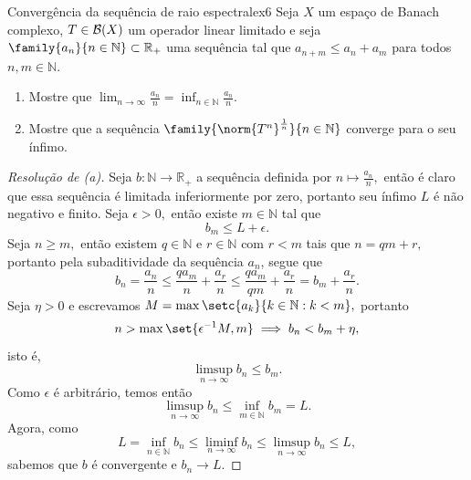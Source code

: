 \begin{exercício}{Convergência da sequência de raio espectral}{ex6}
Seja \(X\) um espaço de Banach complexo, \(T \in \mathcal{B}(X)\) um operador linear limitado e seja \(\family{a_n}{n\in \mathbb{N}} \subset \mathbb{R}_+\) uma sequência tal que \(a_{n+m} \leq a_n + a_m\) para todos \(n,m \in \mathbb{N}.\)
\begin{enumerate}[label=(\alph*)]
  \item Mostre que \(\lim_{n \to \infty}{\frac{a_n}{n}}= \inf_{n\in \mathbb{N}}{\frac{a_n}{n}}.\)
  \item Mostre que a sequência \(\family{\norm{T^n}^{\frac1n}}{n\in\mathbb{N}}\) converge para o seu ínfimo.
\end{enumerate}
\end{exercício}
\begin{proof}[Resolução de (a)]
  Seja \(b : \mathbb{N} \to \mathbb{R}_+\) a sequência definida por \(n \mapsto \frac{a_n}{n},\) então é claro que essa sequência é limitada inferiormente por zero, portanto seu ínfimo \(L\) é não negativo e finito. Seja \(\epsilon > 0,\) então existe \(m \in \mathbb{N}\) tal que
  \begin{equation*}
      b_m \leq L + \epsilon.
  \end{equation*}
  Seja \(n \geq m,\) então existem \(q \in \mathbb{N}\) e \(r \in \mathbb{N}\) com \(r < m\) tais que \(n = qm + r,\) portanto pela subaditividade da sequência \(a_n\), segue que
  \begin{equation*}
    b_n = \frac{a_n}{n} \leq \frac{q a_m}{n} + \frac{a_r}{n} \leq \frac{q a_m}{qm} + \frac{a_r}{n} = b_m + \frac{a_r}{n}.
  \end{equation*}
  Seja \(\eta > 0\) e escrevamos \(M = \max\setc{a_k}{k \in \mathbb{N} : k < m},\) portanto
  \begin{equation*}
    n > \max\set{\epsilon^{-1} M, m} \implies b_n < b_m + \eta,
  \end{equation*}
  isto é,
  \begin{equation*}
    \limsup_{n\to\infty}{b_n} \leq b_m.
  \end{equation*}
  Como \(\epsilon\) é arbitrário, temos então
  \begin{equation*}
    \limsup_{n\to\infty}{b_n} \leq \inf_{m \in \mathbb{N}}{b_m} = L.
  \end{equation*}
  Agora, como
  \begin{equation*}
    L = \inf_{n \in \mathbb{N}}{b_n} \leq \liminf_{n\to\infty}{b_n} \leq \limsup_{n\to\infty}{b_n} \leq L,
  \end{equation*}
  sabemos que \(b\) é convergente e \(b_n \to L\).
\end{proof}
